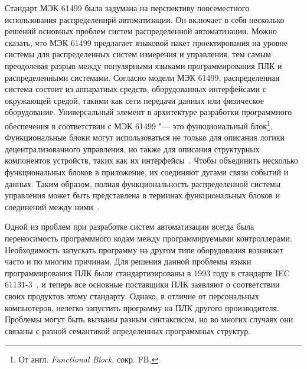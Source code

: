 Стандарт МЭК 61499 была задумана на перспективу повсеместного использования распределеннрй автоматизации. Он включает в себя несколько решений основных проблем систем распределенной автоматизации. Можно сказать, что МЭК 61499 предлагает языковой пакет проектирования на уровне системы для распределенных систем измерения и управления, тем самым преодолевая разрыв между популярными языками программирования ПЛК и распределенными системами. Согласно модели МЭК 61499, распределенная система состоит из аппаратных средств, оборудованных интерфейсами с окружающей средой, такими как сети передачи данных или физическое оборудование. Универсальный элемент в архитектуре разработки программного обеспечения в соответствии с МЭК 61499 "--- это функциональный блок\footnote{От англ. \textit{Functional Block}, сокр. FB.}. Функциональные блоки могут использоваться не только для описания логики децентрализованного управления, но также для описания структурных компонентов устройств, таких как их интерфейсы~\cite{patil2018adapting}. Чтобы объединить несколько функциональных блоков в приложение, их соединяют дугами связи событий и данных. Таким образом, полная функциональность распределенной системы управления может быть представлена ​​в терминах функциональных блоков и соединений между ними~\cite{vyatkin2011iec}.

Одной из проблем при разработке систем автоматизации всегда была переносимость программного кодам между программируемыми контроллерами. Необходимость запускать программу на другом типе оборудования возникает часто и по многим причинам. Для решения данной проблемы языки программирования ПЛК были стандартизированы в 1993 году в стандарте IEC 61131-3~\cite{dai2009case}, и теперь все основные поставщики ПЛК заявляют о соответствии своих продуктов этому стандарту. Однако, в отличие от персональных компьютеров, нелегко запустить программу на ПЛК другого производителя. Проблемы могут быть вызваны разным синтаксисом, но во многих случаях они связаны с разной семантикой определенных программных структур.

